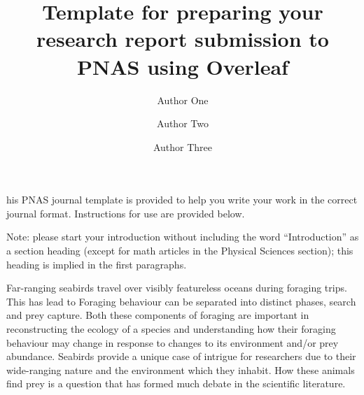 \documentclass[9pt,twocolumn,twoside,lineno]{pnas-new}
\title{Template for preparing your research report submission to PNAS using Overleaf}
\author[a,c,1]{Author One}
\author[b,1,2]{Author Two}
\author[a]{Author Three}
\affil[a]{Affiliation One}
\affil[b]{Affiliation Two}
\affil[c]{Affiliation Three}
\begin{document}
\maketitle
\thispagestyle{firststyle}

his PNAS journal template is provided to help you write your work in the correct journal format. Instructions for use are provided below. 

Note: please start your introduction without including the word ``Introduction'' as a section heading (except for math articles in the Physical Sciences section); this heading is implied in the first paragraphs. 

Far-ranging seabirds travel over visibly featureless oceans during foraging trips. This has lead to 
Foraging behaviour can be separated into distinct phases, search and prey capture. Both these components of foraging are important in reconstructing the ecology of a species and understanding how their foraging behaviour may change in response to changes to its environment and/or prey abundance. Seabirds provide a unique case of intrigue for researchers due to their wide-ranging nature and the environment which they inhabit. How these animals find prey is a question that has formed much debate in the scientific literature.

\end{document}
